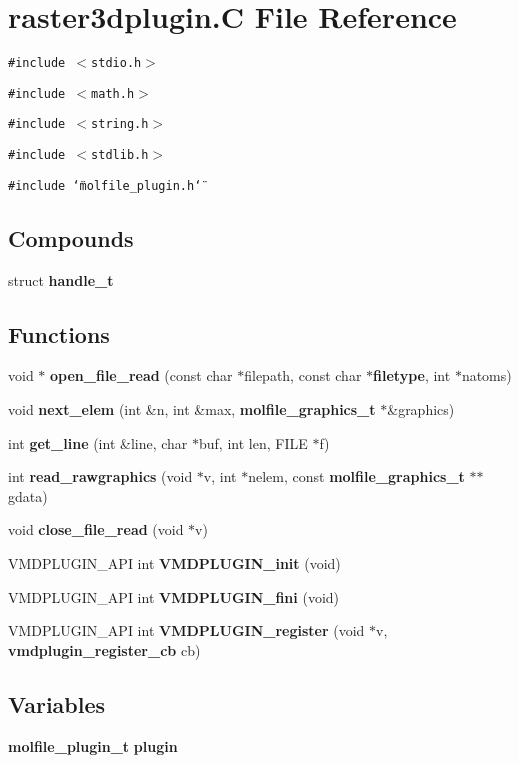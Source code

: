 \section{raster3dplugin.C File Reference}
\label{raster3dplugin_8C}
{\tt \#include $<$stdio.h$>$}\par
{\tt \#include $<$math.h$>$}\par
{\tt \#include $<$string.h$>$}\par
{\tt \#include $<$stdlib.h$>$}\par
{\tt \#include \char`\"{}molfile\_\-plugin.h\char`\"{}}\par
\subsection*{Compounds}
\begin{CompactItemize}
\item 
struct {\bf handle\_\-t}
\end{CompactItemize}
\subsection*{Functions}
\begin{CompactItemize}
\item 
void $\ast$ {\bf open\_\-file\_\-read} (const char $\ast$filepath, const char $\ast${\bf filetype}, int $\ast$natoms)
\item 
void {\bf next\_\-elem} (int \&n, int \&max, {\bf molfile\_\-graphics\_\-t} $\ast$\&graphics)
\item 
int {\bf get\_\-line} (int \&line, char $\ast$buf, int len, FILE $\ast$f)
\item 
int {\bf read\_\-rawgraphics} (void $\ast$v, int $\ast$nelem, const {\bf molfile\_\-graphics\_\-t} $\ast$$\ast$gdata)
\item 
void {\bf close\_\-file\_\-read} (void $\ast$v)
\item 
VMDPLUGIN\_\-API int {\bf VMDPLUGIN\_\-init} (void)
\item 
VMDPLUGIN\_\-API int {\bf VMDPLUGIN\_\-fini} (void)
\item 
VMDPLUGIN\_\-API int {\bf VMDPLUGIN\_\-register} (void $\ast$v, {\bf vmdplugin\_\-register\_\-cb} cb)
\end{CompactItemize}
\subsection*{Variables}
\begin{CompactItemize}
\item 
{\bf molfile\_\-plugin\_\-t} {\bf plugin}
\end{CompactItemize}


